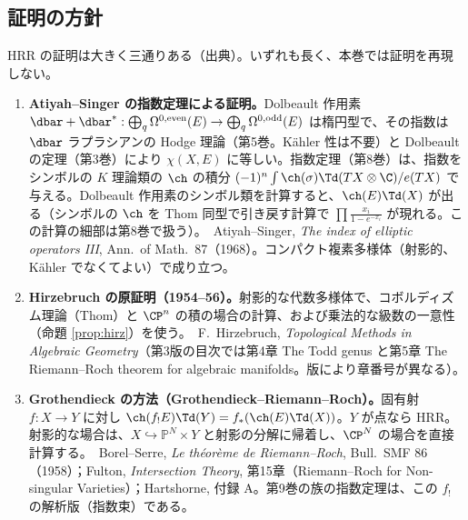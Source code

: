 \subsection{証明の方針}
HRR の証明は大きく三通りある（出典）。いずれも長く、本巻では証明を再現しない。
\begin{enumerate}
\item \textbf{Atiyah--Singer の指数定理による証明。}Dolbeault 作用素 $\dbar+\dbar^*:\bigoplus_q\Omega^{0,{\rm even}}(E)\to\bigoplus_q\Omega^{0,{\rm odd}}(E)$ は楕円型で、その指数は $\dbar$ ラプラシアンの Hodge 理論（第5巻。Kähler 性は不要）と Dolbeault の定理（第3巻）により $\chi(X,E)$ に等しい。指数定理（第8巻）は、指数をシンボルの $K$ 理論類の $\ch$ の積分 $(-1)^n\int\ch(\sigma)\Td(TX\otimes\C)/e(TX)$ で与える。Dolbeault 作用素のシンボル類を計算すると、$\ch(E)\Td(X)$ が出る（シンボルの $\ch$ を Thom 同型で引き戻す計算で $\prod\frac{x_i}{1-e^{-x_i}}$ が現れる。この計算の細部は第8巻で扱う\tQ ）。\tC\ Atiyah--Singer, \emph{The index of elliptic operators III}, Ann.\ of Math.\ 87（1968）。コンパクト複素多様体（射影的、Kähler でなくてよい）で成り立つ。
\item \textbf{Hirzebruch の原証明（1954--56）。}射影的な代数多様体で、コボルディズム理論（Thom）と $\CP^n$ の積の場合の計算、および乗法的な級数の一意性（命題 \ref{prop:hirz}）を使う。\tC\ F.~Hirzebruch, \emph{Topological Methods in Algebraic Geometry}（第3版の目次では第4章 The Todd genus と第5章 The Riemann--Roch theorem for algebraic manifolds。版により章番号が異なる）。
\item \textbf{Grothendieck の方法（Grothendieck--Riemann--Roch）。}固有射 $f:X\to Y$ に対し $\ch(f_!E)\Td(Y)=f_*(\ch(E)\Td(X))$。$Y$ が点なら HRR。射影的な場合は、$X\hookrightarrow\mathbb P^N\times Y$ と射影の分解に帰着し、$\CP^N$ の場合を直接計算する。\tC\ Borel--Serre, \emph{Le théorème de Riemann--Roch}, Bull.\ SMF 86（1958）；Fulton, \emph{Intersection Theory}, 第15章（Riemann--Roch for Non-singular Varieties）；Hartshorne, 付録 A。第9巻の族の指数定理は、この $f_!$ の解析版（指数束）である。
\end{enumerate}
\begin{center}
\end{center}



